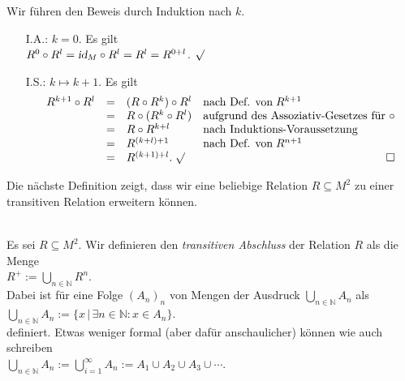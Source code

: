 \proof  Wir f\"{u}hren den Beweis durch Induktion nach $k$.
\begin{enumerate}
\item[I.A.:] $k = 0$.  Es gilt
             \\[0.2cm]
             \hspace*{1.3cm}
             $R^0 \circ R^l = \textsl{id}_M \circ R^l = R^l = R^{0+l}$. $\surd$
\item[I.S.:] $k \mapsto k+1$.  Es gilt
             \[
             \begin{array}{lcll}
               R^{k+1} \circ R^l & = & (R \circ R^k) \circ R^l &
                                       \mbox{nach Def. von}\; R^{k+1} \\
                                 & = & R \circ (R^k \circ R^l) &
                                       \mbox{aufgrund des Assoziativ-Gesetzes f\"{u}r $\circ$}                                       \\
                                 & = & R \circ R^{k+l} &
                                       \mbox{nach Induktions-Voraussetzung} \\
                                 & = & R^{(k+l)+1} &
                                       \mbox{nach Def. von}\; R^{n+1} \\
                                 & = & R^{(k+1)+l}.\; \surd & \hspace*{\fill} \Box
             \end{array}
             \]
\end{enumerate}
             
Die n\"{a}chste Definition zeigt, dass wir eine beliebige Relation $R \subseteq M^2$ zu einer
transitiven Relation erweitern k\"{o}nnen.

\begin{Definition}\hspace*{\fill} \\
  Es sei $R \subseteq M^2$.
  Wir definieren den \emph{transitiven Abschluss} der Relation $R$ als die Menge \\[0.2cm]
  \hspace*{1.3cm} $R^+ := \bigcup\limits_{n\in\mathbb{N}} R^n$. \\
  Dabei ist f\"{u}r eine Folge $(A_n)_n$ von Mengen der Ausdruck $\bigcup\limits_{n\in\mathbb{N}} A_n$ 
  als \\[0.2cm]
  \hspace*{1.3cm}
  $\bigcup\limits_{n\in\mathbb{N}} A_n := \bigl\{ x \,\big|\, \exists n \in \mathbb{N}: x \in A_n \bigr\}$.
  \\[0.2cm]
  definiert.  Etwas weniger formal (aber daf\"{u}r anschaulicher) k\"{o}nnen wie auch schreiben
  \\[0.2cm]
  \hspace*{1.3cm}
 $\bigcup\limits_{n\in\mathbb{N}} A_n := \bigcup\limits_{i=1}^{\infty} A_n := A_1 \cup A_2 \cup A_3 \cup \cdots $. \eox
\end{Definition}

